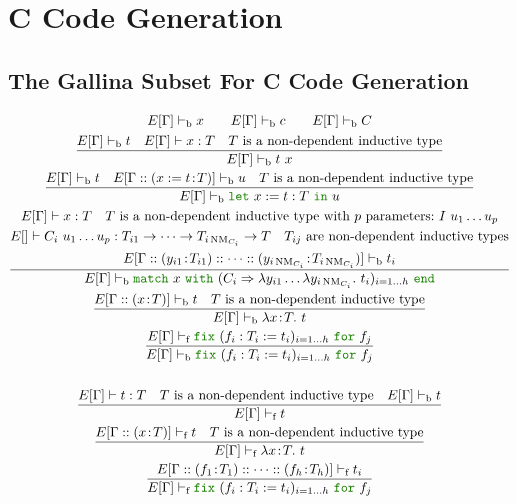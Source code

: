 \documentclass[a4paper,fleqn]{article}
\def\gallina{\textrm{Gallina}}
\newcommand{\kwlet}{\mbox{\color{mygreen}\ttfamily let}}
\newcommand{\kwin}{\mbox{\color{mygreen}\ttfamily in}}
\newcommand{\kwmatch}{\mbox{\color{mygreen}\ttfamily match}}
\newcommand{\kwwith}{\mbox{\color{mygreen}\ttfamily with}}
\newcommand{\kwend}{\mbox{\color{mygreen}\ttfamily end}}
\newcommand{\kwfix}{\mbox{\color{mygreen}\ttfamily fix}}
\newcommand{\kwfor}{\mbox{\color{mygreen}\ttfamily for}}
\newcommand{\lamT}[3]{\lambda #1\!:\!#2.~#3}
\newcommand{\lamB}[1]{\lambda #1.~}
\newcommand{\lassum}[2]{(#1\!:\!#2)}
\newcommand{\ldef}[3]{(#1:=#2\!:\!#3)}
\newcommand{\letin}[3]{\kwlet~#1:=#2~\kwin~#3}
\newcommand{\match}[4]{\kwmatch~#1~\kwwith~(#2 \Rightarrow #3)_{#4}~\kwend}
\newcommand{\fix}[4]{\kwfix~(#1 := #2)_{#3}~\kwfor~#4}
\DeclareMathOperator{\NM}{NM}
\newcommand{\vdashb}{\vdash_{\textrm{b}}}
\newcommand{\vdashf}{\vdash_{\textrm{f}}}
\begin{document}
\section{C Code Generation}\label{sec:c-code-gen}
\subsection{The \gallina{} Subset For C Code Generation}\label{sec:gallinasubsetforcgen}
\raggedright
\begin{gather*}
  E[\Gamma] \vdashb x \qquad
  E[\Gamma] \vdashb c \qquad
  E[\Gamma] \vdashb C \\
  \dfrac{
    E[\Gamma] \vdashb t \quad
    E[\Gamma] \vdash x : T \quad
    \text{$T$ is a non-dependent inductive type}
  }{
    E[\Gamma] \vdashb t~x
  } \\
  \dfrac{
    E[\Gamma] \vdashb t \quad
    E[\Gamma::\ldef{x}{t}{T}] \vdashb u \quad
    \text{$T$ is a non-dependent inductive type}
  }{
    E[\Gamma] \vdashb \letin{x}{t:T}{u}
  } \\
  \dfrac{
    \begin{gathered}
      E[\Gamma] \vdash x:T \quad
      \text{$T$ is a non-dependent inductive type with $p$ parameters:}~I~u_1\dots u_p \\
      E[] \vdash C_i~u_1\dots u_p: T_{i1} \rightarrow \dots \rightarrow T_{i\NM_{C_i}} \rightarrow T \quad
      \text{$T_{ij}$ are non-dependent inductive types} \\
      E[\Gamma::\lassum{y_{i1}}{T_{i1}}::\dots::\lassum{y_{i\NM_{C_i}}}{T_{i\NM_{C_i}}}] \vdashb t_i
    \end{gathered}
  }{
    E[\Gamma] \vdashb \match{x}{C_i}{\lambda y_{i1}\dots\lamB{y_{i\NM_{C_i}}}t_i}{i=1\dots h}
  } \\
  \dfrac{
    E[\Gamma::\lassum{x}{T}] \vdashb t \quad
    \text{$T$ is a non-dependent inductive type}
  }{
    E[\Gamma] \vdashb \lamT{x}{T}{t}
  } \\
  \dfrac{
    E[\Gamma] \vdashf \fix{f_i:T_i}{t_i}{i=1\dots h}{f_j}
  }{
    E[\Gamma] \vdashb \fix{f_i:T_i}{t_i}{i=1\dots h}{f_j}
  } \\
  \\
  \dfrac{
    E[\Gamma] \vdash t : T \quad
    \text{$T$ is a non-dependent inductive type} \quad
    E[\Gamma] \vdashb t
  }{
    E[\Gamma] \vdashf t
  } \\
  \dfrac{
    E[\Gamma::\lassum{x}{T}] \vdashf t \quad
    \text{$T$ is a non-dependent inductive type}
  }{
    E[\Gamma] \vdashf \lamT{x}{T}{t}
  } \\
  \dfrac{
    E[\Gamma::\lassum{f_1}{T_1}::\dots::\lassum{f_h}{T_h}] \vdashf t_i
  }{
    E[\Gamma] \vdashf \fix{f_i:T_i}{t_i}{i=1\dots h}{f_j}
  }
\end{gather*}
\end{document}
